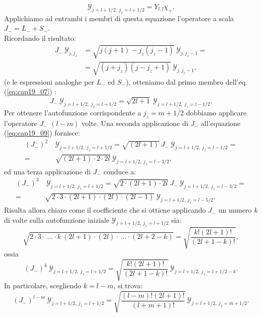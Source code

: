 \documentclass[a4paper,12pt,oneside]{book}
\begin{document}
\begin{equation} \label{eq:cap19_07}
 \mathcal{Y}_{j=l+1/2,~j_z=l+1/2} = Y_{l,l} \chi_+ .
\end{equation}
Applichiamo ad entrambi i membri di questa equazione l'operatore a scala $J_- = L_-+S_-$.\\
Ricordando il risultato:
\begin{align} \label{eq:cap19_08}
J_-~ \mathcal{Y}_{j,j_z} &= \sqrt{j(j+1)-j_z(j_z-1)}~\mathcal{Y}_{j,j_z-1} = \\ \nonumber
&= \sqrt{(j+j_z)(j-j_z+1)}~\mathcal{Y}_{j,j_z-1} ,
\end{align}
(e le espressioni analoghe per $L_-$ ed $S_-$), otteniamo dal primo membro dell'eq. (\ref{eq:cap19_07}) :
\begin{equation} \label{eq:cap19_09}
J_-~ \mathcal{Y}_{j=l+1/2,~j_z=l+1/2} = \sqrt{2l+1}~\mathcal{Y}_{j=l+1/2,~j_z=l-1/2} .
\end{equation}
Per ottenere l'autofunzione corrispondente a $j_z=m+1/2$ dobbiamo applicare l'operatore $J_-$ $(l-m)$ volte. Una seconda applicazione di $J_-$ all'equazione (\ref{eq:cap19_09}) fornisce:
\begin{align}
(J_-)^2~&\mathcal{Y}_{j=l+1/2,~j_z=l+1/2} = \sqrt{(2l+1)}~J_-~\mathcal{Y}_{j=l+1/2,~j_z=l-1/2} = \nonumber \\
=~ &\sqrt{(2l+1)\cdot 2 \cdot 2l}~\mathcal{Y}_{j=l+1/2,~j_z=l-3/2},
\end{align}
ed una terza applicazione di $J_-$ conduce a:
\begin{align}
(J_-)^3&~\mathcal{Y}_{j=l+1/2,~j_z=l+1/2} = \sqrt{2\cdot(2l+1)\cdot 2l}~J_-~\mathcal{Y}_{j=l+1/2,~j_z=l-3/2} = \nonumber\\
=~&\sqrt{2\cdot 3\cdot(2l+1) \cdot (2l) \cdot (2l-1)}~\mathcal{Y}_{j=l+1/2,~j_z=l-5/2}.
\end{align}
Risulta allora chiaro come il coefficiente che si ottiene applicando $J_-$ un numero $k$ di volte sulla autofunzione iniziale $\mathcal{Y}_{j=l+1/2,~j_z=l+1/2}$ sia:
\begin{equation}
\sqrt{2\cdot 3\cdot~...\cdot k~(2l+1) \cdot (2l) \cdot ~...\cdot(2l+2-k)} = \sqrt{\frac{k! (2l+1)!}{(2l+1-k)!}},
\end{equation}
ossia
\begin{equation} \label{eq:cap19_10}
(J_-)^k~\mathcal{Y}_{j=l+1/2,~j_z=l+1/2} = \sqrt{\frac{k! (2l+1)!}{(2l+1-k)!}}~\mathcal{Y}_{j=l+1/2,~j_z=l+1/2-k}.
\end{equation}
In particolare, scegliendo $k=l-m$, si trova:
\begin{equation} \label{eq:cap19_11}
(J_-)^{l-m}~\mathcal{Y}_{j=l+1/2,~j_z=l+1/2} = \sqrt{\frac{(l-m)! (2l+1)!}{(l+m+1)!}}~\mathcal{Y}_{j=l+1/2,~j_z=m+1/2}.
\end{equation}
\end{document}
